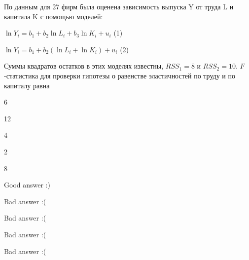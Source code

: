 
\begin{question}
По данным для 27 фирм была оценена зависимость выпуска Y от труда L и капитала K с помощью моделей:

\(\ln Y_i = b_1 + b_2 \ln L_i + b_3 \ln K_i + u_i\) (1)

\(\ln Y_i = b_1 + b_2 (\ln L_i + \ln K_i) + u_i\) (2)

Суммы квадратов остатков в этих моделях известны, \(RSS_1=8\) и \(RSS_2=10\). \(F\)-статистика для проверки гипотезы о равенстве эластичностей по труду и по капиталу равна
\begin{answerlist}
  \item 6
  \item 12
  \item 4
  \item 2
  \item 8
\end{answerlist}
\end{question}

\begin{solution}
\begin{answerlist}
  \item Good answer :)
  \item Bad answer :(
  \item Bad answer :(
  \item Bad answer :(
  \item Bad answer :(
\end{answerlist}
\end{solution}

